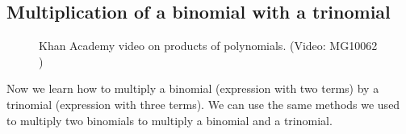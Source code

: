     \label{m39387*cid4}
            \subsection*{ Multiplication of a binomial with a trinomial}
            \nopagebreak
            \label{m39387*eip-109}
    \setcounter{subfigure}{0}


	\begin{figure}[H] %
    
    
    \textnormal{Khan Academy video on products of polynomials.}\vspace{.1in} \nopagebreak
  \label{m39387*yt-media1}\label{m39387*yt-video1}
             { (Video:  MG10062 )}
      
      \vspace{2pt}
    \vspace{.1in}
    
    

 \end{figure}   

    \addtocounter{footnote}{-0}
    Now we learn how to multiply a binomial (expression with two terms) by a
trinomial (expression with three terms). We can use the same methods we used to
multiply two binomials to multiply a binomial and a trinomial.\par 
      

